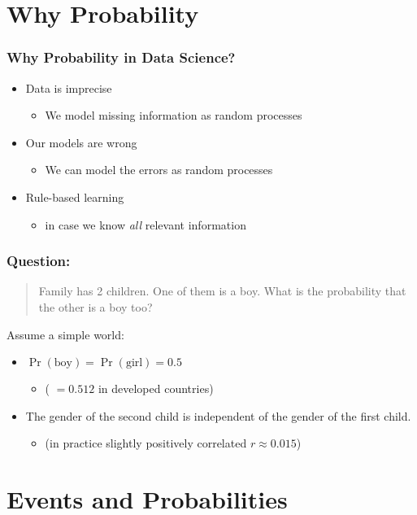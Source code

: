 \documentclass[mathserif, xcolor=table, svgnames]{beamer}
\begin{document}
\section{Why Probability}

\begin{frame}
  \frametitle{Why Probability in Data Science?}
  \begin{itemize}
  \item Data is imprecise
    \begin{itemize}
    \item We model missing information as random processes
    \end{itemize}
  \item Our models are wrong
    \begin{itemize}
    \item We can model the errors as random processes
    \end{itemize}
    \pause
  \item Rule-based learning
    \begin{itemize}
    \item in case we know \emph{all} relevant information
    \end{itemize}
  \end{itemize}
\end{frame}

\begin{frame}
  \frametitle{Question:}
  \begin{quotation}
    Family has 2 children.  One of them is a boy.  What is
    the probability that the other is a boy too?
  \end{quotation}
  Assume a simple world:
  \begin{itemize}
  \item $\Pr(\text{boy}) = \Pr(\text{girl}) = 0.5$
    \begin{itemize}
    \item ( $= 0.512$ in developed countries)
    \end{itemize}
  \item The gender of the second child is independent of the gender of
    the first child.
    \begin{itemize}
    \item (in practice slightly positively correlated $r \approx 0.015$)
    \end{itemize}
  \end{itemize}
\end{frame}

\section{Events and Probabilities}
\end{document}
